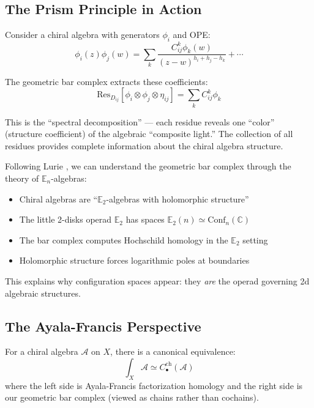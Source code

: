 \subsection{The Prism Principle in Action}

\begin{example}
Consider a chiral algebra with generators $\phi_i$ and OPE:
$$\phi_i(z) \phi_j(w) = \sum_k \frac{C_{ij}^k \phi_k(w)}{(z-w)^{h_i + h_j - h_k}} + \cdots$$

The geometric bar complex extracts these coefficients:
$$\text{Res}_{D_{ij}}[\phi_i \otimes \phi_j \otimes \eta_{ij}] = \sum_k C_{ij}^k \phi_k$$

This is the ``spectral decomposition'' --- each residue reveals one ``color'' (structure coefficient) 
of the algebraic ``composite light.'' The collection of all residues provides complete information about 
the chiral algebra structure.
\end{example}

\begin{remark}
Following Lurie \cite{HA}, we can understand the geometric bar complex through the theory of 
$\mathbb{E}_n$-algebras:

\begin{itemize}
\item Chiral algebras are ``$\mathbb{E}_2$-algebras with holomorphic structure''
\item The little 2-disks operad $\mathbb{E}_2$ has spaces $\mathbb{E}_2(n) \simeq \text{Conf}_n(\mathbb{C})$
\item The bar complex computes Hochschild homology in the $\mathbb{E}_2$ setting
\item Holomorphic structure forces logarithmic poles at boundaries
\end{itemize}

This explains why configuration spaces appear: they \emph{are} the operad governing 2d algebraic structures.
\end{remark}

\subsection{The Ayala-Francis Perspective}

\begin{theorem}[Factorization Homology = Bar Complex]\label{thm:fact-homology}
For a chiral algebra $\mathcal{A}$ on $X$, there is a canonical equivalence:
$$\int_X \mathcal{A} \simeq C_{\bullet}^{\text{ch}}(\mathcal{A})$$
where the left side is Ayala-Francis factorization homology and the right side is our geometric bar complex 
(viewed as chains rather than cochains).
\end{theorem}

